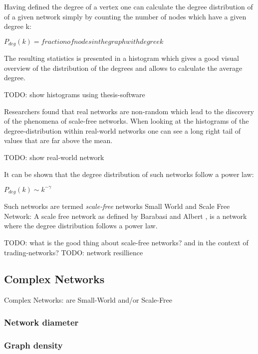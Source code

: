 \documentclass[../Bachelorarbeit.tex]{subfiles}
\begin{document}
Having defined the degree of a vertex one can calculate the degree distribution of of a given network simply by counting the number of nodes which have a given degree k:

\begin{center}
$P_{deg}(k) = fraction of nodes in the graph with degree k$
\end{center}

The resulting statistics is presented in a histogram which gives a good visual overview of the distribution of the degrees and allows to calculate the average degree. 

TODO: show histograms using thesis-software

\medskip
Researchers found that real networks are non-random which lead to the discovery of the phenomena of scale-free networks. When looking at the histograms of the degree-distribution within real-world networks one can see a long right tail of values that are far above the mean.

TODO: show real-world network 

It can be shown that the degree distribution of such networks follow a power law:

\begin{center}
$P_{deg}(k) \sim k^{-\gamma}$
\end{center}

Such networks are termed \textit{scale-free} networks \cite{BarabasiAlbert_EmergenceScaling}
Small World and Scale Free Network:  A scale free network as defined by Barabasi and Albert \citep{BarabasiAlbert_EmergenceScaling}, is a network where the degree distribution follows a power law.

TODO: what is the good thing about scale-free networks? and in the context of trading-networks?
TODO: network resillience

\subsection{Complex Networks}
Complex Networks: are Small-World and/or Scale-Free \citep{BarratWeigt_PropertiesSmallWorld} \citep{AmaralScalaStanley_ClassesSmallWorld}

\subsubsection{Network diameter}
\subsubsection{Graph density}
\end{document}
